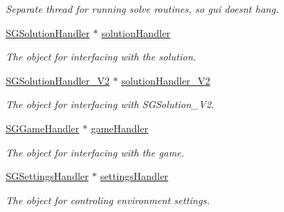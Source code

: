 \begin{DoxyCompactItemize}
\begin{DoxyCompactList}\small\item\em Separate thread for running solve routines, so gui doesn\textquotesingle{}t hang. \end{DoxyCompactList}\item 
\mbox{\label{classSGMainWindow_a0863e0ab765177721bbda61a6494a60a}} 
\hyperlink{classSGSolutionHandler}{S\+G\+Solution\+Handler} $\ast$ \hyperlink{classSGMainWindow_a0863e0ab765177721bbda61a6494a60a}{solution\+Handler}
\begin{DoxyCompactList}\small\item\em The object for interfacing with the solution. \end{DoxyCompactList}\item 
\mbox{\label{classSGMainWindow_ae8ef3d9c4be577f804c54fb1bccf63a2}} 
\hyperlink{classSGSolutionHandler__V2}{S\+G\+Solution\+Handler\+\_\+\+V2} $\ast$ \hyperlink{classSGMainWindow_ae8ef3d9c4be577f804c54fb1bccf63a2}{solution\+Handler\+\_\+\+V2}
\begin{DoxyCompactList}\small\item\em The object for interfacing with S\+G\+Solution\+\_\+\+V2. \end{DoxyCompactList}\item 
\mbox{\label{classSGMainWindow_aac360598eca3556adf4bba2588fb5f3c}} 
\hyperlink{classSGGameHandler}{S\+G\+Game\+Handler} $\ast$ \hyperlink{classSGMainWindow_aac360598eca3556adf4bba2588fb5f3c}{game\+Handler}
\begin{DoxyCompactList}\small\item\em The object for interfacing with the game. \end{DoxyCompactList}\item 
\mbox{\label{classSGMainWindow_ab29540bcb97791859537ca8da988e3fe}} 
\hyperlink{classSGSettingsHandler}{S\+G\+Settings\+Handler} $\ast$ \hyperlink{classSGMainWindow_ab29540bcb97791859537ca8da988e3fe}{settings\+Handler}
\begin{DoxyCompactList}\small\item\em The object for controling environment settings. \end{DoxyCompactList}\item 
\mbox{\label{classSGMainWindow_a2acf5b1f87ba1dd721fc916661c1acfe}} 

\end{DoxyCompactItemize}
